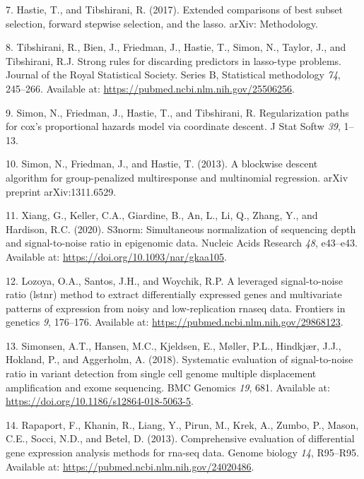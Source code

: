 \documentclass[
]{book}
\newenvironment{cslreferences}%
  {}%
  {\par}
\begin{document}
\begin{cslreferences}
\leavevmode\hypertarget{ref-Hastie:2017aa}{}%
7. Hastie, T., and Tibshirani, R. (2017). Extended comparisons of best subset selection, forward stepwise selection, and the lasso. arXiv: Methodology.

\leavevmode\hypertarget{ref-Tibshirani:2012aa}{}%
8. Tibshirani, R., Bien, J., Friedman, J., Hastie, T., Simon, N., Taylor, J., and Tibshirani, R.J. Strong rules for discarding predictors in lasso-type problems. Journal of the Royal Statistical Society. Series B, Statistical methodology \emph{74}, 245--266. Available at: \url{https://pubmed.ncbi.nlm.nih.gov/25506256}.

\leavevmode\hypertarget{ref-Simon:2011aa}{}%
9. Simon, N., Friedman, J., Hastie, T., and Tibshirani, R. Regularization paths for cox's proportional hazards model via coordinate descent. J Stat Softw \emph{39}, 1--13.

\leavevmode\hypertarget{ref-Simon:2013aa}{}%
10. Simon, N., Friedman, J., and Hastie, T. (2013). A blockwise descent algorithm for group-penalized multiresponse and multinomial regression. arXiv preprint arXiv:1311.6529.

\leavevmode\hypertarget{ref-Xiang:2020aa}{}%
11. Xiang, G., Keller, C.A., Giardine, B., An, L., Li, Q., Zhang, Y., and Hardison, R.C. (2020). S3norm: Simultaneous normalization of sequencing depth and signal-to-noise ratio in epigenomic data. Nucleic Acids Research \emph{48}, e43--e43. Available at: \url{https://doi.org/10.1093/nar/gkaa105}.

\leavevmode\hypertarget{ref-Lozoya:2018aa}{}%
12. Lozoya, O.A., Santos, J.H., and Woychik, R.P. A leveraged signal-to-noise ratio (lstnr) method to extract differentially expressed genes and multivariate patterns of expression from noisy and low-replication rnaseq data. Frontiers in genetics \emph{9}, 176--176. Available at: \url{https://pubmed.ncbi.nlm.nih.gov/29868123}.

\leavevmode\hypertarget{ref-Simonsen:2018aa}{}%
13. Simonsen, A.T., Hansen, M.C., Kjeldsen, E., Møller, P.L., Hindkjær, J.J., Hokland, P., and Aggerholm, A. (2018). Systematic evaluation of signal-to-noise ratio in variant detection from single cell genome multiple displacement amplification and exome sequencing. BMC Genomics \emph{19}, 681. Available at: \url{https://doi.org/10.1186/s12864-018-5063-5}.

\leavevmode\hypertarget{ref-Rapaport:2013aa}{}%
14. Rapaport, F., Khanin, R., Liang, Y., Pirun, M., Krek, A., Zumbo, P., Mason, C.E., Socci, N.D., and Betel, D. (2013). Comprehensive evaluation of differential gene expression analysis methods for rna-seq data. Genome biology \emph{14}, R95--R95. Available at: \url{https://pubmed.ncbi.nlm.nih.gov/24020486}.


\end{cslreferences}
\end{document}
